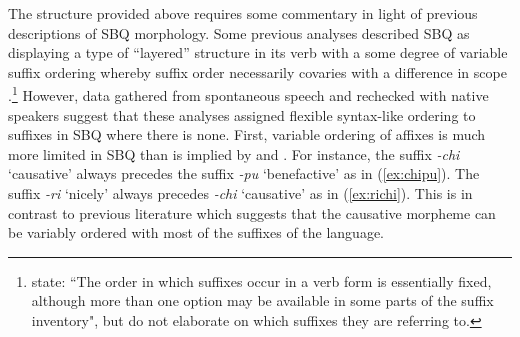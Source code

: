 \documentclass[output=paper]{langscibook}
\begin{document}

\largerpage[1.5]
The structure provided above requires some commentary in light of previous descriptions of SBQ morphology. Some previous analyses described SBQ as displaying a type of ``layered'' structure in its verb with a some degree of variable suffix ordering whereby suffix order necessarily covaries with a difference in scope \citep{muysken:1981,vanderkerke:1996}.\footnote{ \citet[209]{adelaar2004} state: ``The order in which suffixes occur in a verb form is essentially fixed, although more than one option may be available in some parts of the suffix inventory", but do not elaborate on which suffixes they are referring to.} However, data gathered from spontaneous speech and rechecked with native speakers suggest that these analyses assigned flexible syntax-like ordering to suffixes in SBQ where there is none. First, variable ordering of affixes is much more limited in SBQ than is implied by \citet{muysken:1981} and \citet{vanderkerke:1996}. For instance, the suffix \textit{-chi} `causative' always precedes the suffix \textit{-pu} `benefactive' as in (\ref{ex:chipu}). The suffix \textit{-ri} `nicely' always precedes \textit{-chi} `causative' as in (\ref{ex:richi}). This is in contrast to previous literature which suggests that the causative morpheme can be variably ordered with most of the suffixes of the language.
\end{document}
